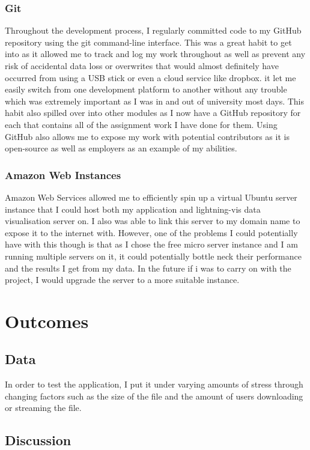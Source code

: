 \documentclass[]{report}
\begin{document}
			\subsection{Git}
			Throughout the development process, I regularly committed code to my GitHub repository using the git command-line interface. This was a great habit to get into as it allowed me to track and log my work throughout as well as prevent any risk of accidental data loss or overwrites that would almost definitely have occurred from using a USB stick or even a cloud service like dropbox. it let me easily switch from one development platform to another without any trouble which was extremely important as I was in and out of university most days. This habit also spilled over into other modules as I now have a GitHub repository for each that contains all of the assignment work I have done for them. Using GitHub also allows me to expose my work with potential contributors as it is open-source as well as employers as an example of my abilities. 
			
			\subsection{Amazon Web Instances}
			Amazon Web Services allowed me to efficiently spin up a virtual Ubuntu server instance that I could host both my application and lightning-vis data visualisation server on. I also was able to link this server to my domain name to expose it to the internet with. However, one of the problems I could potentially have with this though is that as I chose the free micro server instance and I am running multiple servers on it, it could potentially bottle neck their performance and the results I get from my data. In the future if i was to carry on with the project, I would upgrade the server to a more suitable instance.
			
	\chapter{Outcomes}
		\section{Data}
		In order to test the application, I put it under varying amounts of stress through changing factors such as the size of the file and the amount of users downloading or streaming the file.

		\section{Discussion}
		
\end{document}
